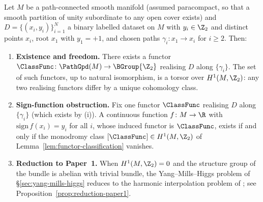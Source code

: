 \begin{theorem}\label{thm:main}
Let $M$ be a path-connected smooth manifold (assumed paracompact, so
that a smooth partition of unity subordinate to any open cover
exists) and $D=\{(x_i,y_i)\}_{i=1}^N$ a binary labelled dataset on
$M$ with $y_i\in\Z_2$ and distinct points $x_i$, root $x_1$ with
$y_1=+1$, and chosen paths $\gamma_i\colon x_1\to x_i$ for $i\geq 2$.
Then:
\begin{enumerate}[label=(\roman*),leftmargin=2em]
  \item \textbf{Existence and freedom.} There exists a functor
  $\ClassFunc\colon\PathGpd(M)\to\BGroup{\Z_2}$ realising $D$ along
  $\{\gamma_i\}$. The set of such functors, up to natural isomorphism,
  is a torsor over $H^1(M,\Z_2)$: any two realising functors differ
  by a unique cohomology class.
  \item \textbf{Sign-function obstruction.} Fix one functor
  $\ClassFunc$ realising $D$ along $\{\gamma_i\}$ (which exists by
  (i)). A continuous function $f\colon M\to\R$ with
  $\mathrm{sign}\,f(x_i)=y_i$ for all $i$, whose induced functor is
  $\ClassFunc$, exists if and only if the monodromy class
  $[\ClassFunc]\in H^1(M,\Z_2)$ of
  Lemma~\ref{lem:functor-classification} vanishes.
  \item \textbf{Reduction to Paper~1.} When $H^1(M,\Z_2)=0$ and the
  structure group of the bundle is abelian with trivial bundle, the
  Yang--Mills--Higgs problem of \S\ref{sec:yang-mills-higgs} reduces
  to the harmonic interpolation problem of
  \cite[Theorem~13.3]{Vasii2026Paper1};
  see Proposition~\ref{prop:reduction-paper1}.
\end{enumerate}
\end{theorem}

